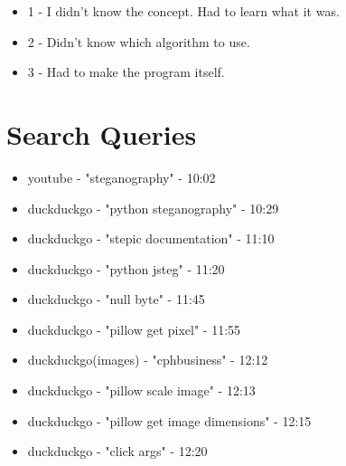 \documentclass[11pt,a4paper]{article}
\begin{document}
\begin{itemize}
	\item 1 - I didn't know the concept. Had to learn what it was.
	\item 2 - Didn't know which algorithm to use.
	\item 3 - Had to make the program itself.
\end{itemize}

\section{Search Queries}
\begin{itemize}
	\item youtube - "steganography" - 10:02
	\item duckduckgo - "python steganography" - 10:29
	\item duckduckgo - "stepic documentation" - 11:10
	\item duckduckgo - "python jsteg" - 11:20
	\item duckduckgo - "null byte" - 11:45
	\item duckduckgo - "pillow get pixel" - 11:55
	\item duckduckgo(images) - "cphbusiness" - 12:12
	\item duckduckgo - "pillow scale image" - 12:13
	\item duckduckgo - "pillow get image dimensions" - 12:15
	\item duckduckgo - "click args" - 12:20
\end{itemize}
\end{document}
